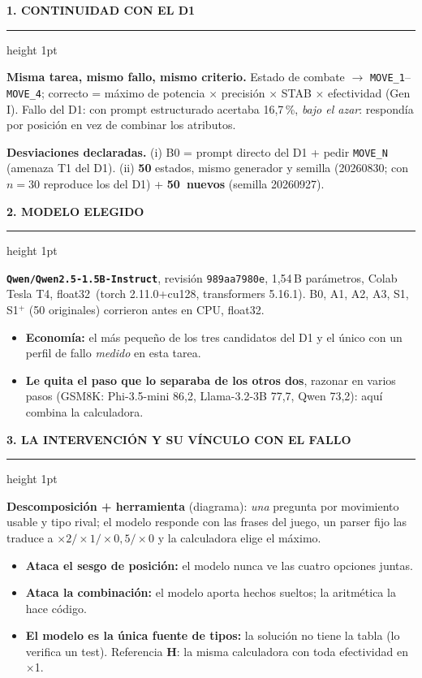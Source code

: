 \documentclass[10pt,a4paper]{extarticle}
\newcommand{\holdN}{50}
\newcommand{\holdSeed}{20260927}
\newcommand{\hw}{Tesla T4, float32}
\newcommand{\hwNote}{B0, A1, A2, A3, S1, S1$^{+}$ (50 originales) corrieron antes en CPU, float32.}
\newcommand{\libs}{torch 2.11.0+cu128, transformers 5.16.1}
\newcommand{\modelId}{Qwen/Qwen2.5-1.5B-Instruct}
\newcommand{\modelRev}{989aa7980e}
\newcommand{\nParams}{1{,}54}
\newcommand{\nStates}{50}
\newcommand{\seed}{20260830}
\newcommand{\heading}[1]{%
  \par\vspace{1.2mm}\noindent
  {\color{navy}\bfseries\small\MakeUppercase{#1}}\par\vspace{0.5mm}
  {\color{amber}\hrule height 1pt}\vspace{0.9mm}\noindent\ignorespaces}
\begin{document}
\noindent
\begin{minipage}[t]{0.488\linewidth}
\setlength{\parskip}{0.55mm}
\heading{1. Continuidad con el D1}
\textbf{Misma tarea, mismo fallo, mismo criterio.} Estado de combate $\to$ \texttt{MOVE\_1}--\texttt{MOVE\_4}; correcto = m\'aximo de potencia $\times$ precisi\'on $\times$ STAB $\times$ efectividad (Gen I). Fallo del D1: con prompt estructurado acertaba 16{,}7\,\%, \emph{bajo el azar}: respond\'ia por posici\'on en vez de combinar los atributos.

\textbf{Desviaciones declaradas.} (i) B0 = prompt directo del D1 + pedir \texttt{MOVE\_N} (amenaza T1 del D1). (ii) \textbf{\nStates} estados, mismo generador y semilla (\seed; con $n{=}30$ reproduce los del D1) + \textbf{\holdN\ nuevos} (semilla \holdSeed).

\heading{2. Modelo elegido}
\textbf{\texttt{\modelId}}, revisi\'on \texttt{\modelRev}, \nParams\,B par\'ametros, Colab \hw\ (\libs). {\scriptsize \hwNote}
\begin{itemize}
\item \textbf{Econom\'ia:} el m\'as peque\~no de los tres candidatos del D1 y el \'unico con un perfil de fallo \emph{medido} en esta tarea.
\item \textbf{Le quita el paso que lo separaba de los otros dos}, razonar en varios pasos (GSM8K: Phi-3.5-mini 86{,}2, Llama-3.2-3B 77{,}7, Qwen 73{,}2): aqu\'i combina la calculadora.
\end{itemize}

\heading{3. La intervenci\'on y su v\'inculo con el fallo}
\textbf{Descomposici\'on + herramienta} (diagrama): \emph{una} pregunta por movimiento usable y tipo rival; el modelo responde con las frases del juego, un parser fijo las traduce a $\times2/\times1/\times0{,}5/\times0$ y la calculadora elige el m\'aximo.
\begin{itemize}
\item \textbf{Ataca el sesgo de posici\'on:} el modelo nunca ve las cuatro opciones juntas.
\item \textbf{Ataca la combinaci\'on:} el modelo aporta hechos sueltos; la aritm\'etica la hace c\'odigo.
\item \textbf{El modelo es la \'unica fuente de tipos:} la soluci\'on no tiene la tabla (lo verifica un test). Referencia \textbf{H}: la misma calculadora con toda efectividad en $\times$1.
\end{itemize}


\end{minipage}
\end{document}
